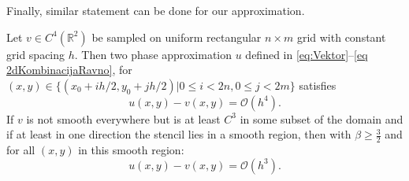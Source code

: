 Finally, similar statement can be done for our approximation.
	
\begin{theorem}
Let $v\in C^4(\mathbb{R}^2)$ be sampled on uniform rectangular $n\times m$ grid with constant grid spacing $h$.
Then two phase approximation $u$ defined in \eqref{eq:Vektor}--\eqref{eq 2dKombinacijaRavno}, %
for $(x,y)\in\{ (x_0+ih/2,y_0+jh/2)|0\leq i< 2n, 0\leq j< 2m   \}$ satisfies
$$u(x,y)-v(x,y)=\mathcal{O}(h^4).$$
If $v$ is not smooth everywhere but is at least $C^3$ in some subset of the domain and if at least in one direction the stencil lies in a smooth region, then with $\beta\geq \frac{3}{2}$ and for all $(x,y)$ in this smooth region:
$$u(x,y)-v(x,y)=\mathcal{O}(h^3).$$
\label{th1}
\end{theorem}	

